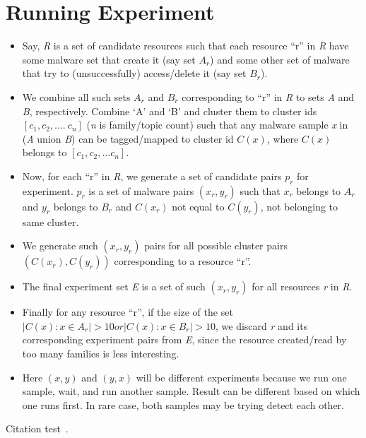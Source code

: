 \section{Running Experiment}
\label{sec:Running Experiment}
\begin{itemize}
  \item Say, \emph{R} is a set of candidate resources such that each resource ``r'' in \emph{R} have some malware set that create it (say set $A_r$) and some other set of malware that try to (unsuccessfully) access/delete it (say set $B_r$).
    \item We combine all such sets $A_r$ and $B_r$ corresponding to ``r'' in \emph{R} to sets \emph{A} and \emph{B}, respectively. Combine `A' and `B' and cluster them to cluster ids $[c_1,c_2,\ldots.\ c_n]$ (\emph{n} is family/topic count) such that any malware sample \emph{x} in (\emph{A} union \emph{B}) can be tagged/mapped to cluster id $C(x)$, where $C(x)$ belongs to $[c_1, c_2, \ldots c_n]$.
    \item Now, for each ``r'' in \emph{R}, we generate a set of candidate pairs $p_r$ for experiment. $p_r$ is a set of malware pairs $(x_r, y_r)$ such that $x_r$ belongs to $A_r$ and $y_r$ belongs to $B_r$ and $C(x_r)$ not equal to $C(y_r)$, not belonging to same cluster.
    \item We generate such $(x_r, y_r)$ pairs for all possible cluster pairs $(C(x_r), C(y_r))$ corresponding to a resource ``r''.
    \item The final experiment set \emph{E} is a set of such $(x_r, y_r)$ for all resources \emph{r} in \emph{R}.
    \item Finally for any resource ``r'', if the size of the set $| C(x) : x \in A_r | > 10 or  | C(x) : x \in B_r | > 10$, we discard \emph{r} and its corresponding experiment pairs from \emph{E}, since the resource created/read by too many families is less interesting.
    \item Here $(x,y)$ and $(y,x)$ will be different experiments because we run one sample, wait, and run another sample. Result can be different based on which one runs first. In rare case, both samples may be trying detect each other.

\end{itemize}




Citation test~\parencite{latex}.
